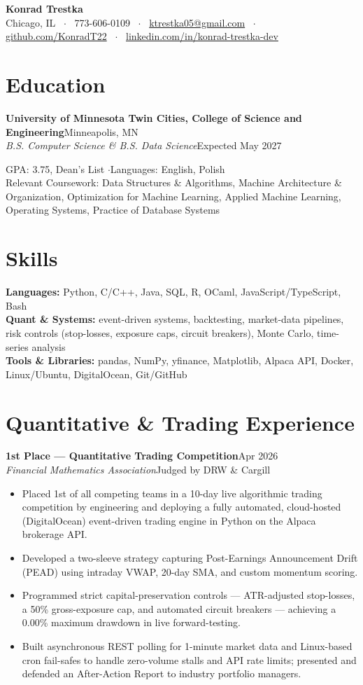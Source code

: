 \documentclass[letterpaper,10.5pt]{article}
\newcommand{\entry}[4]{\textbf{#1}\hfill{\small #2}\\\textit{\small #3}\hfill{\small #4}\par\vspace{1pt}}
\begin{document}
{\centering
{\LARGE\bfseries Konrad Trestka}\\[3pt]
{\small Chicago, IL ~$\cdot$~ 773-606-0109 ~$\cdot$~ \href{mailto:ktrestka05@gmail.com}{ktrestka05@gmail.com} ~$\cdot$~ \href{https://github.com/KonradT22}{github.com/KonradT22} ~$\cdot$~ \href{https://www.linkedin.com/in/konrad-trestka-dev}{linkedin.com/in/konrad-trestka-dev}}\par}
\vspace{2pt}

\section{Education}
\entry{University of Minnesota Twin Cities, College of Science and Engineering}{Minneapolis, MN}{B.S. Computer Science \& B.S. Data Science}{Expected May 2027}
{\small GPA: 3.75, Dean's List \quad$\cdot$\quad Languages: English, Polish \\
Relevant Coursework: Data Structures \& Algorithms, Machine Architecture \& Organization, Optimization for Machine Learning, Applied Machine Learning, Operating Systems, Practice of Database Systems}

\section{Skills}
{\small \textbf{Languages:} Python, C/C++, Java, SQL, R, OCaml, JavaScript/TypeScript, Bash \\
\textbf{Quant \& Systems:} event-driven systems, backtesting, market-data pipelines, risk controls (stop-losses, exposure caps, circuit breakers), Monte Carlo, time-series analysis \\
\textbf{Tools \& Libraries:} pandas, NumPy, yfinance, Matplotlib, Alpaca API, Docker, Linux/Ubuntu, DigitalOcean, Git/GitHub}

\section{Quantitative \& Trading Experience}
\entry{1st Place --- Quantitative Trading Competition}{Apr 2026}{Financial Mathematics Association}{Judged by DRW \& Cargill}
\begin{itemize}
  \item Placed 1st of all competing teams in a 10-day live algorithmic trading competition by engineering and deploying a fully automated, cloud-hosted (DigitalOcean) event-driven trading engine in Python on the Alpaca brokerage API.
  \item Developed a two-sleeve strategy capturing Post-Earnings Announcement Drift (PEAD) using intraday VWAP, 20-day SMA, and custom momentum scoring.
  \item Programmed strict capital-preservation controls --- ATR-adjusted stop-losses, a 50\% gross-exposure cap, and automated circuit breakers --- achieving a 0.00\% maximum drawdown in live forward-testing.
  \item Built asynchronous REST polling for 1-minute market data and Linux-based cron fail-safes to handle zero-volume stalls and API rate limits; presented and defended an After-Action Report to industry portfolio managers.
\end{itemize}
\end{document}
